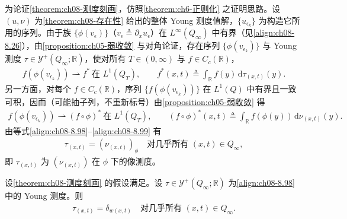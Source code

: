 \documentclass[../../main.tex]{subfiles}%
\begin{document}
为论证\cref{theorem:ch08-测度刻画}，仿照\cref{theorem:ch6-正则化} 之证明思路。设 $(u,\nu)$ 为\cref{theorem:ch08-存在性} 给出的整体 Young 测度值解，$\{u_{\epsilon_k}\}$ 为构造它所用的序列。由于族 $\{\phi(v_\epsilon)\}$（$v_\epsilon\triangleq \partial_x u_\epsilon$）在 $L^\infty(Q_\infty)$ 中有界（见\eqref{align:ch08-8.26}），由\cref{proposition:ch05-弱收敛} 与对角论证，存在序列 $\{\phi(v_{\epsilon_k})\}$ 与 Young 测度 $\tau\in\mathcal{Y}^+(Q_\infty;\mathbb{R})$，使对所有 $T\in(0,\infty)$ 与 $f\in C_c(\mathbb{R})$，
\begin{align}
f(\phi(v_{\epsilon_k}))\rightharpoonup f^*\ \text{在 }L^1(Q_T),\qquad
f^*(x,t)\triangleq \int_{\mathbb{R}}f(y)\,\mathrm{d}\tau_{(x,t)}(y). \label{align:ch08-8.98}
\end{align}
另一方面，对每个 $f\in C_c(\mathbb{R})$，序列 $\{f(\phi(v_{\epsilon_k}))\}$ 在 $L^1(Q)$ 中有界且一致可积，因而（可能抽子列，不重新标号）由\cref{proposition:ch05-弱收敛} 得
\begin{align}
f(\phi(v_{\epsilon_k}))\rightharpoonup(f\circ\phi)^*\ \text{在 }L^1(Q_T),\qquad
(f\circ\phi)^*(x,t)\triangleq \int_{\mathbb{R}}f(\phi(y))\,\mathrm{d}\nu_{(x,t)}(y). \label{align:ch08-8.99}
\end{align}
由等式\eqref{align:ch08-8.98}--\eqref{align:ch08-8.99} 有
\begin{align}
\tau_{(x,t)}=(\nu_{(x,t)})_\phi\quad\text{对几乎所有 }(x,t)\in Q_\infty, \label{align:ch08-8.100}
\end{align}
即 $\tau_{(x,t)}$ 为 $(\nu_{(x,t)})$ 在 $\phi$ 下的像测度。

\begin{theorem}\label{theorem:ch08-τ为Dirac}
设\cref{theorem:ch08-测度刻画} 的假设满足。设 $\tau\in\mathcal{Y}^+(Q_\infty;\mathbb{R})$ 为\eqref{align:ch08-8.98} 中的 Young 测度。则
\begin{align}
\tau_{(x,t)}=\delta_{w(x,t)}\quad\text{对几乎所有 }(x,t)\in Q_\infty. \label{align:ch08-8.101}
\end{align}
\end{theorem}
\end{document}
